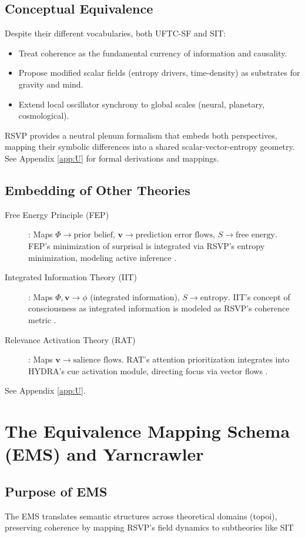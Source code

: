 \documentclass[12pt]{report}
\newcommand{\PhiRSVP}{\Phi}
\newcommand{\vRSVP}{\mathbf{v}}
\newcommand{\SRSVP}{S}
\begin{document}
\section{Conceptual Equivalence}
Despite their different vocabularies, both UFTC-SF and SIT:
\begin{itemize}
    \item Treat coherence as the fundamental currency of information and causality.
    \item Propose modified scalar fields (entropy drivers, time-density) as substrates for gravity and mind.
    \item Extend local oscillator synchrony to global scales (neural, planetary, cosmological).
\end{itemize}
RSVP provides a neutral plenum formalism that embeds both perspectives, mapping their symbolic differences into a shared scalar-vector-entropy geometry. See Appendix \ref{app:U} for formal derivations and mappings.

\section{Embedding of Other Theories}
\begin{description}
    \item[Free Energy Principle (FEP)]: Maps \(\PhiRSVP \to \text{prior belief}\), \(\vRSVP \to \text{prediction error flows}\), \(\SRSVP \to \text{free energy}\). FEP’s minimization of surprisal is integrated via RSVP’s entropy minimization, modeling active inference \citep{Friston2010}.
    \item[Integrated Information Theory (IIT)]: Maps \(\PhiRSVP, \vRSVP \to \phi\) (integrated information), \(\SRSVP \to \text{entropy}\). IIT’s concept of consciousness as integrated information is modeled as RSVP’s coherence metric \citep{Tononi2016}.
    \item[Relevance Activation Theory (RAT)]: Maps \(\vRSVP \to \text{salience flows}\). RAT’s attention prioritization integrates into HYDRA’s cue activation module, directing focus via vector flows \citep{RAT2025}.
\end{description}
See Appendix \ref{app:U}.

\chapter{The Equivalence Mapping Schema (EMS) and Yarncrawler}
\section{Purpose of EMS}
The EMS translates semantic structures across theoretical domains (topoi), preserving coherence by mapping RSVP’s field dynamics to subtheories like SIT
\end{document}
